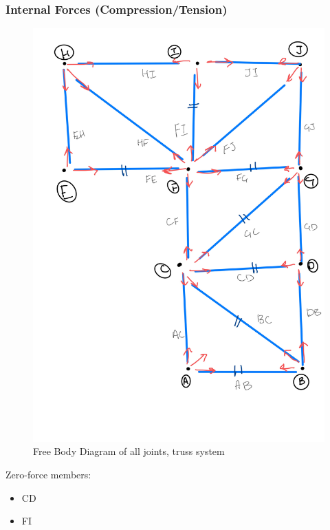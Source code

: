 \subsubsection{Internal Forces (Compression/Tension)}
\begin{figure}
\centering
\includegraphics[width=\textwidth]{con3_fbd.jpg}
\caption{Free Body Diagram of all joints, truss system}
\end{figure}
Zero-force members:
\begin{itemize}
\item CD
\item FI
\end{itemize}
\centering
